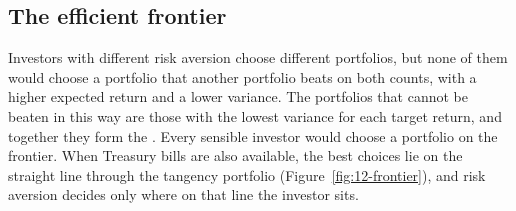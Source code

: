 \subsection{The efficient frontier}
\label{sec:12-frontier}

Investors with different risk aversion choose different portfolios, but none of them would choose a portfolio that another portfolio beats on both counts, with a higher expected return and a lower variance. The portfolios that cannot be beaten in this way are those with the lowest variance for each target return, and together they form the . Every sensible investor would choose a portfolio on the frontier. When Treasury bills are also available, the best choices lie on the straight line through the tangency portfolio (Figure~\ref{fig:12-frontier}), and risk aversion decides only where on that line the investor sits.


